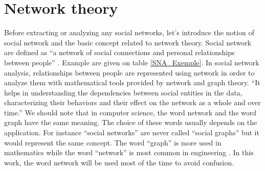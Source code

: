 \documentclass[a4paper, 12pt]{report}
\begin{document}
\chapter{Network theory}
\begin{table}
\center
{}
\caption{Example of social networks \citep{SNA_Overview}}\label{SNA_Exemple}
\end{table}

Before extracting or analyzing any social networks, let's introduce the notion of social network and the basic concept related to network theory.
Social network are defined as ``a network of social connections and personal relationships between people'' \citep{SNA_Overview}. Example are given on table \ref{SNA_Exemple}.
In social network analysis, relationships between people are represented using network in order to analyze them with mathematical tools provided by network 
and graph theory. ``It helps in understanding the
dependencies between social entities in the data, characterizing
their behaviors and their effect on the network as
a whole and over time.'' \citep{SNA_Overview}
We should note that in computer science, the word network and the word graph have the same meaning. The choice of these words usually depends on the application. For instance ``social networks'' are never called  ``social graphs'' 
but it would represent the same concept. The word ``graph'' is more used in mathematics while the word ``network'' is most common in engineering \citep{network_theory}. In this work, the word network will be used most of the time to avoid confusion.
\end{document}
